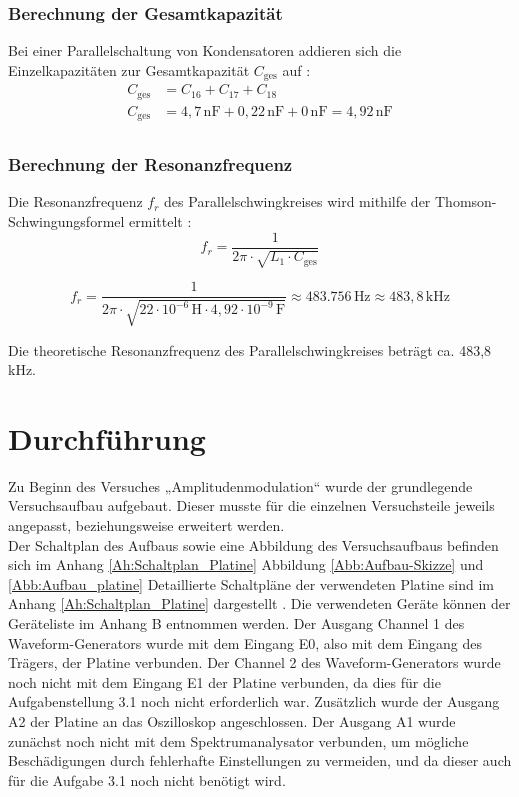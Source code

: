 \documentclass[12pt]{scrartcl}
\begin{document}
\subsubsection*{Berechnung der Gesamtkapazität}
Bei einer Parallelschaltung von Kondensatoren addieren sich die Einzelkapazitäten zur Gesamtkapazität $C_{\text{ges}}$ auf \cite{hagmannGrundlagenElektrotechnikBewaehrte2020}:
\begin{align*}
    C_{\text{ges}} &= C_{16} + C_{17} + C_{18} \\
    C_{\text{ges}} &= 4,7\,\text{nF} + 0,22\,\text{nF} + 0\,\text{nF} = 4,92\,\text{nF} \\
\end{align*}

\subsubsection*{Berechnung der Resonanzfrequenz}
Die Resonanzfrequenz $f_r$ des Parallelschwingkreises wird mithilfe der Thomson-Schwingungsformel ermittelt \cite{hagmannGrundlagenElektrotechnikBewaehrte2020}:
\begin{equation}
    f_r = \frac{1}{2\pi \cdot \sqrt{L_1 \cdot C_{\text{ges}}}}
    \label{Gl:Thomson-Schwingungsformel}
\end{equation}


\begin{equation}
f_r = \frac{1}{2\pi \cdot \sqrt{22 \cdot 10^{-6}\,\text{H} \cdot 4,92 \cdot 10^{-9}\,\text{F}}} \approx 483.756\,\text{Hz} \approx 483,8\,\text{kHz}
\label{Gl:Mittenfrequenz_rechnerisch}
\end{equation}

Die theoretische Resonanzfrequenz des Parallelschwingkreises beträgt ca. 483,8\,kHz.
\newpage
\section{Durchführung}


Zu Beginn des Versuches „Amplitudenmodulation“ wurde der grundlegende Versuchsaufbau aufgebaut. Dieser musste für die einzelnen Versuchsteile jeweils angepasst, beziehungsweise erweitert 
werden. \\
Der Schaltplan des Aufbaus sowie eine Abbildung des Versuchsaufbaus befinden sich im Anhang \ref{Ah:Schaltplan_Platine} Abbildung \ref{Abb:Aufbau-Skizze} und \ref{Abb:Aufbau_platine} Detaillierte Schaltpläne der verwendeten Platine sind im Anhang \ref{Ah:Schaltplan_Platine} dargestellt
 \cite{Labor_Amplitudenmodulation}.  Die verwendeten Geräte können der Geräteliste im Anhang B entnommen werden. Der Ausgang Channel 1 des Waveform-Generators wurde mit dem Eingang E0, also mit dem Eingang des Trägers, 
 der Platine verbunden. Der Channel 2 des Waveform-Generators wurde noch nicht mit dem Eingang E1 der Platine verbunden, da dies für die Aufgabenstellung 3.1 noch nicht erforderlich war. 
 Zusätzlich wurde der Ausgang A2 der Platine an das Oszilloskop angeschlossen. Der Ausgang A1 wurde zunächst noch nicht mit dem Spektrumanalysator verbunden, um mögliche Beschädigungen durch
  fehlerhafte Einstellungen zu vermeiden, und da dieser auch für die Aufgabe 3.1 noch nicht benötigt wird.
\end{document}
